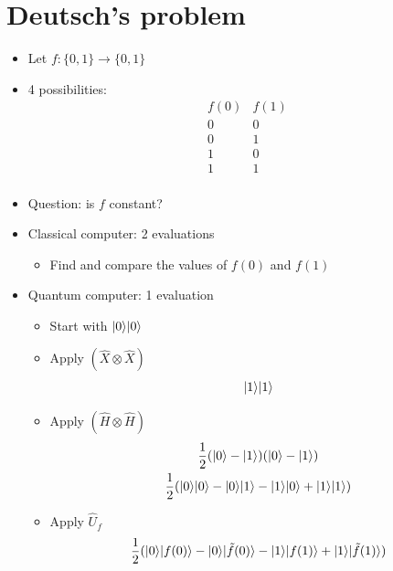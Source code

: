 \documentclass{../doc}
\begin{document}
  \section{Deutsch's problem}
    \begin{itemize}
      \item Let $f:\{0,1\} \to \{0,1\}$
      \item 4 possibilities:
        \begin{equation*}
          \begin{matrix}
            f(0) & f(1) \\
            0 & 0 \\
            0 & 1 \\
            1 & 0 \\
            1 & 1 \\
          \end{matrix}
        \end{equation*}
      \item Question: is $f$ constant?
      \item Classical computer: 2 evaluations
        \begin{itemize}
          \item Find and compare the values of $f(0)$ and $f(1)$
        \end{itemize}
      \item Quantum computer: 1 evaluation
        \begin{itemize}
          \item Start with $| 0 \rangle| 0 \rangle$
          \item Apply $(\hat X \otimes \hat X)$
            \begin{equation}
              | 1 \rangle| 1 \rangle
            \end{equation}
          \item Apply $(\hat H \otimes \hat H)$
            \begin{gather}
              \frac12 (| 0 \rangle - | 1 \rangle) (| 0 \rangle - | 1 \rangle) \\
              \frac12 (| 0 \rangle| 0 \rangle - | 0 \rangle| 1 \rangle - | 1 \rangle| 0 \rangle + | 1 \rangle| 1 \rangle)
            \end{gather}
          \item Apply $\hat U_f$
            \begin{equation}
              \frac12 (| 0 \rangle| f(0) \rangle - | 0 \rangle| \tilde f(0) \rangle - | 1 \rangle| f(1) \rangle + | 1 \rangle| \tilde f(1) \rangle)
            \end{equation}
            \begin{itemize}

\end{itemize}
\end{itemize}
\end{itemize}
\end{document}

